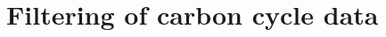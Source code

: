 \documentclass[12pt,oneside]{amsart}
\begin{document}
\newpage{}


\section{Filtering of carbon cycle data}

%
%

\end{document}

